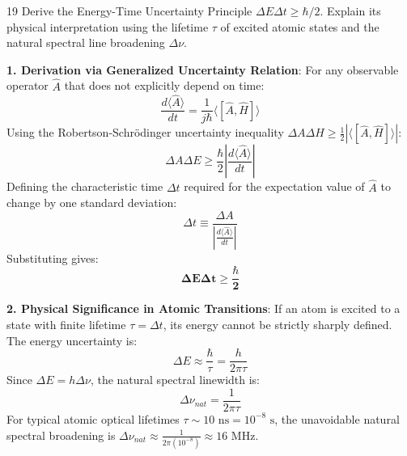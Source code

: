 \begin{theoryq}{19}
Derive the Energy-Time Uncertainty Principle $\Delta E \Delta t \ge \hbar/2$. Explain its physical interpretation using the lifetime $\tau$ of excited atomic states and the natural spectral line broadening $\Delta \nu$.
\end{theoryq}
\begin{theorysol}
\textbf{1. Derivation via Generalized Uncertainty Relation}:
For any observable operator $\hat{A}$ that does not explicitly depend on time:
\begin{equation}
\frac{d\langle \hat{A}\rangle}{dt} = \frac{1}{j\hbar}\langle [\hat{A}, \hat{H}] \rangle
\end{equation}
Using the Robertson-Schrödinger uncertainty inequality $\Delta A \Delta H \ge \frac{1}{2}|\langle [\hat{A}, \hat{H}] \rangle|$:
\begin{equation}
\Delta A \Delta E \ge \frac{\hbar}{2}\left|\frac{d\langle \hat{A}\rangle}{dt}\right|
\end{equation}
Defining the characteristic time $\Delta t$ required for the expectation value of $\hat{A}$ to change by one standard deviation:
\begin{equation}
\Delta t \equiv \frac{\Delta A}{\left|\frac{d\langle \hat{A}\rangle}{dt}\right|}
\end{equation}
Substituting gives:
\begin{equation}
\mathbf{\Delta E \Delta t \ge \frac{\hbar}{2}}
\end{equation}

\textbf{2. Physical Significance in Atomic Transitions}:
If an atom is excited to a state with finite lifetime $\tau = \Delta t$, its energy cannot be strictly sharply defined. The energy uncertainty is:
\begin{equation}
\Delta E \approx \frac{\hbar}{\tau} = \frac{h}{2\pi \tau}
\end{equation}
Since $\Delta E = h \Delta\nu$, the natural spectral linewidth is:
\begin{equation}
\Delta\nu_{nat} = \frac{1}{2\pi \tau}
\end{equation}
For typical atomic optical lifetimes $\tau \sim 10\text{ ns} = 10^{-8}\text{ s}$, the unavoidable natural spectral broadening is $\Delta\nu_{nat} \approx \frac{1}{2\pi(10^{-8})} \approx 16\text{ MHz}$.
\end{theorysol}
\vspace{4mm}


